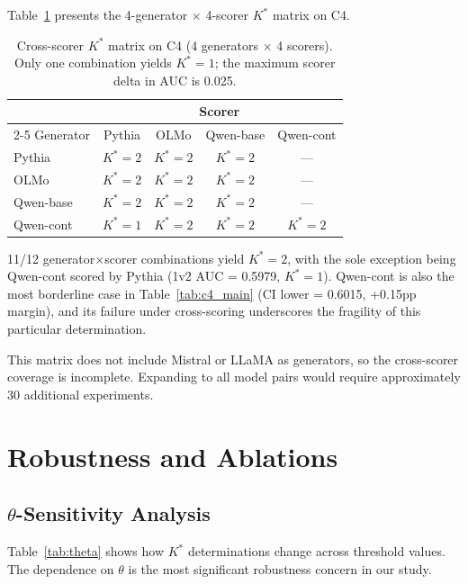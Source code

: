 \documentclass[11pt]{article}
\newcommand{\kstar}{K^*}
\newcommand{\thetaval}{\theta}
\begin{document}
Table~\ref{tab:cross_scorer} presents the 4-generator $\times$ 4-scorer $\kstar$ matrix on C4.

\begin{table}[t]
\centering
\caption{Cross-scorer $\kstar$ matrix on C4 (4 generators $\times$ 4 scorers). Only one combination yields $\kstar{=}1$; the maximum scorer delta in AUC is 0.025.}
\label{tab:cross_scorer}
\small
\begin{tabular}{lcccc}
\toprule
& \multicolumn{4}{c}{Scorer} \\
\cmidrule(lr){2-5}
Generator & Pythia & OLMo & Qwen-base & Qwen-cont \\
\midrule
Pythia & $\kstar{=}2$ & $\kstar{=}2$ & $\kstar{=}2$ & --- \\
OLMo & $\kstar{=}2$ & $\kstar{=}2$ & $\kstar{=}2$ & --- \\
Qwen-base & $\kstar{=}2$ & $\kstar{=}2$ & $\kstar{=}2$ & --- \\
Qwen-cont & $\kstar{=}1$ & $\kstar{=}2$ & $\kstar{=}2$ & $\kstar{=}2$ \\
\bottomrule
\end{tabular}
\end{table}

11/12 generator$\times$scorer combinations yield $\kstar{=}2$, with the sole exception being Qwen-cont scored by Pythia (1v2 AUC = 0.5979, $\kstar{=}1$). Qwen-cont is also the most borderline case in Table~\ref{tab:c4_main} (CI lower = 0.6015, +0.15pp margin), and its failure under cross-scoring underscores the fragility of this particular determination.

This matrix does not include Mistral or LLaMA as generators, so the cross-scorer coverage is incomplete. Expanding to all model pairs would require approximately 30 additional experiments.


\section{Robustness and Ablations}
\label{sec:ablations}

\subsection{$\thetaval$-Sensitivity Analysis}
\label{sec:theta}

Table~\ref{tab:theta} shows how $\kstar$ determinations change across threshold values. The dependence on $\thetaval$ is the most significant robustness concern in our study.
\end{document}

